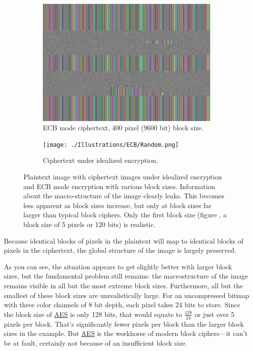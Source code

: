 \documentclass[11pt,ebook,table,dvipsnames]{memoir}
\begin{document}
\begin{figure}[p]
  \begin{subfigure}[b]{.45\textwidth}
    \includegraphics[width=\textwidth]{./Illustrations/ECB/Ciphertext400.png}
    \caption{ECB mode ciphertext, 400 pixel (9600 bit) block size.}
  \end{subfigure}
  \quad
  \begin{subfigure}[b]{.45\textwidth}
    \texttt{[image: ./Illustrations/ECB/Random.png]}
    \caption{Ciphertext under idealized encryption.}
    \label{fig:ECBDemoIdealizedCiphertext}
  \end{subfigure}

  \caption{Plaintext image with ciphertext images under idealized
    encryption and ECB mode encryption with various block sizes.
    Information about the macro-structure of the image clearly leaks.
    This becomes less apparent as block sizes increase, but only at
    block sizes far larger than typical block ciphers. Only the first
    block size (figure , a block size of 5
    pixels or 120 bits) is realistic.}
\end{figure}

Because identical blocks of pixels in the plaintext will map to
identical blocks of pixels in the ciphertext, the global structure of
the image is largely preserved.

As you can see, the situation appears to get slightly better with
larger block sizes, but the fundamental problem still remains: the
macrostructure of the image remains visible in all but the most
extreme block sizes. Furthermore, all but the smallest of these block
sizes are unrealistically large. For an uncompressed bitmap with three
color channels of 8 bit depth, each pixel takes 24 bits to store.
Since the block size of \hyperref[AES]{AES} is only 128 bits, that would equate to
$\frac{128}{24}$ or just over 5 pixels per block. That's significantly
fewer pixels per block than the larger block sizes in the example. But
\hyperref[AES]{AES} is the workhorse of modern block ciphers---it can't be at fault,
certainly not because of an insufficient block size.
\end{document}

